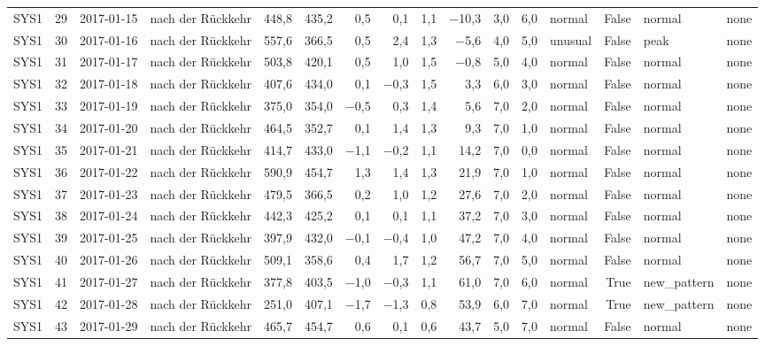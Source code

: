 \begin{tabular}{lrllrrrrrrrrlrll}
SYS1 & 29 & 2017-01-15 & nach der Rückkehr & 448,8 & 435,2 & 0,5 & 0,1 & 1,1 & $-$10,3 & 3,0 & 6,0 & normal & False & normal & none \\
SYS1 & 30 & 2017-01-16 & nach der Rückkehr & 557,6 & 366,5 & 0,5 & 2,4 & 1,3 & $-$5,6 & 4,0 & 5,0 & unusual & False & peak & none \\
SYS1 & 31 & 2017-01-17 & nach der Rückkehr & 503,8 & 420,1 & 0,5 & 1,0 & 1,5 & $-$0,8 & 5,0 & 4,0 & normal & False & normal & none \\
SYS1 & 32 & 2017-01-18 & nach der Rückkehr & 407,6 & 434,0 & 0,1 & $-$0,3 & 1,5 & 3,3 & 6,0 & 3,0 & normal & False & normal & none \\
SYS1 & 33 & 2017-01-19 & nach der Rückkehr & 375,0 & 354,0 & $-$0,5 & 0,3 & 1,4 & 5,6 & 7,0 & 2,0 & normal & False & normal & none \\
SYS1 & 34 & 2017-01-20 & nach der Rückkehr & 464,5 & 352,7 & 0,1 & 1,4 & 1,3 & 9,3 & 7,0 & 1,0 & normal & False & normal & none \\
SYS1 & 35 & 2017-01-21 & nach der Rückkehr & 414,7 & 433,0 & $-$1,1 & $-$0,2 & 1,1 & 14,2 & 7,0 & 0,0 & normal & False & normal & none \\
SYS1 & 36 & 2017-01-22 & nach der Rückkehr & 590,9 & 454,7 & 1,3 & 1,4 & 1,3 & 21,9 & 7,0 & 1,0 & normal & False & normal & none \\
SYS1 & 37 & 2017-01-23 & nach der Rückkehr & 479,5 & 366,5 & 0,2 & 1,0 & 1,2 & 27,6 & 7,0 & 2,0 & normal & False & normal & none \\
SYS1 & 38 & 2017-01-24 & nach der Rückkehr & 442,3 & 425,2 & 0,1 & 0,1 & 1,1 & 37,2 & 7,0 & 3,0 & normal & False & normal & none \\
SYS1 & 39 & 2017-01-25 & nach der Rückkehr & 397,9 & 432,0 & $-$0,1 & $-$0,4 & 1,0 & 47,2 & 7,0 & 4,0 & normal & False & normal & none \\
SYS1 & 40 & 2017-01-26 & nach der Rückkehr & 509,1 & 358,6 & 0,4 & 1,7 & 1,2 & 56,7 & 7,0 & 5,0 & normal & False & normal & none \\
SYS1 & 41 & 2017-01-27 & nach der Rückkehr & 377,8 & 403,5 & $-$1,0 & $-$0,3 & 1,1 & 61,0 & 7,0 & 6,0 & normal & True & new\_pattern & none \\
SYS1 & 42 & 2017-01-28 & nach der Rückkehr & 251,0 & 407,1 & $-$1,7 & $-$1,3 & 0,8 & 53,9 & 6,0 & 7,0 & normal & True & new\_pattern & none \\
SYS1 & 43 & 2017-01-29 & nach der Rückkehr & 465,7 & 454,7 & 0,6 & 0,1 & 0,6 & 43,7 & 5,0 & 7,0 & normal & False & normal & none \\

\end{tabular}

